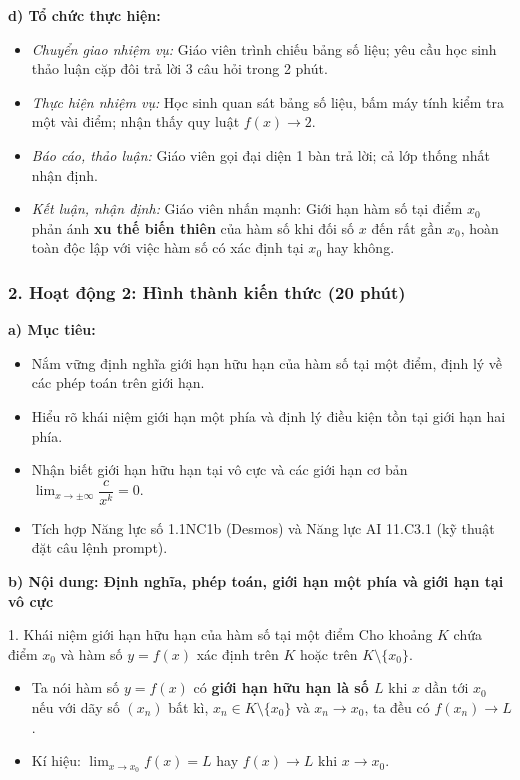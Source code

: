 \documentclass[12pt, a4paper]{article}
\begin{document}
\noindent \textbf{d) Tổ chức thực hiện:}
\begin{itemize}[leftmargin=0.8cm]
    \item \textit{Chuyển giao nhiệm vụ:} Giáo viên trình chiếu bảng số liệu; yêu cầu học sinh thảo luận cặp đôi trả lời 3 câu hỏi trong 2 phút.
    \item \textit{Thực hiện nhiệm vụ:} Học sinh quan sát bảng số liệu, bấm máy tính kiểm tra một vài điểm; nhận thấy quy luật $f(x) \to 2$.
    \item \textit{Báo cáo, thảo luận:} Giáo viên gọi đại diện 1 bàn trả lời; cả lớp thống nhất nhận định.
    \item \textit{Kết luận, nhận định:} Giáo viên nhấn mạnh: Giới hạn hàm số tại điểm $x_0$ phản ánh \textbf{xu thế biến thiên} của hàm số khi đối số $x$ đến rất gần $x_0$, hoàn toàn độc lập với việc hàm số có xác định tại $x_0$ hay không.
\end{itemize}

\subsubsection*{2. Hoạt động 2: Hình thành kiến thức (20 phút)}

\noindent \textbf{a) Mục tiêu:}
\begin{itemize}[leftmargin=0.6cm]
    \item Nắm vững định nghĩa giới hạn hữu hạn của hàm số tại một điểm, định lý về các phép toán trên giới hạn.
    \item Hiểu rõ khái niệm giới hạn một phía và định lý điều kiện tồn tại giới hạn hai phía.
    \item Nhận biết giới hạn hữu hạn tại vô cực và các giới hạn cơ bản $\lim_{x \to \pm\infty} \dfrac{c}{x^k} = 0$.
    \item Tích hợp Năng lực số 1.1NC1b (Desmos) và Năng lực AI 11.C3.1 (kỹ thuật đặt câu lệnh prompt).
\end{itemize}

\noindent \textbf{b) Nội dung: Định nghĩa, phép toán, giới hạn một phía và giới hạn tại vô cực}

\begin{pedabox}{1. Khái niệm giới hạn hữu hạn của hàm số tại một điểm}
Cho khoảng $K$ chứa điểm $x_0$ và hàm số $y = f(x)$ xác định trên $K$ hoặc trên $K \setminus \{x_0\}$.
\begin{itemize}[leftmargin=0.6cm]
    \item Ta nói hàm số $y = f(x)$ có \textbf{giới hạn hữu hạn là số $L$} khi $x$ dần tới $x_0$ nếu với dãy số $(x_n)$ bất kì, $x_n \in K \setminus \{x_0\}$ và $x_n \to x_0$, ta đều có $f(x_n) \to L$.
    \item Kí hiệu: $\lim_{x \to x_0} f(x) = L$ hay $f(x) \to L$ khi $x \to x_0$.
\end{itemize}
\end{pedabox}
\end{document}
